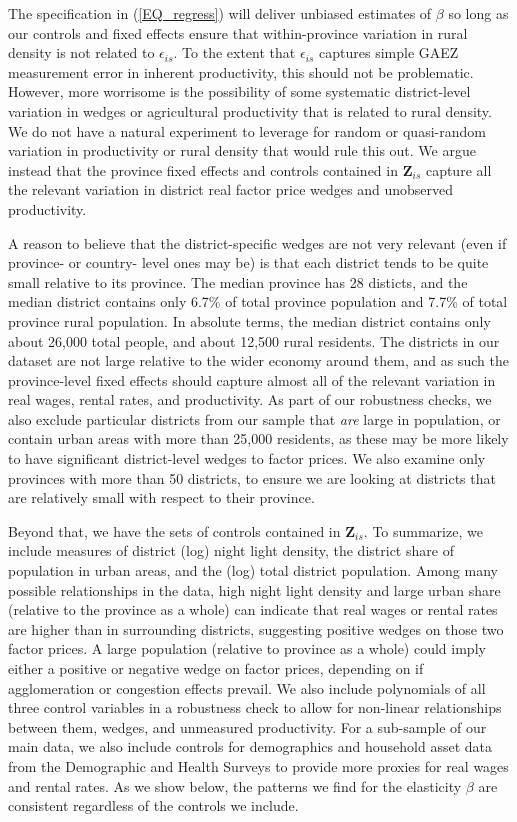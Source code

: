 The specification in (\ref{EQ_regress}) will deliver unbiased estimates of $\beta$ so long as our controls and fixed effects ensure that within-province variation in rural density is not related to $\epsilon_{is}$. To the extent that $\epsilon_{is}$ captures simple GAEZ measurement error in inherent productivity, this should not be problematic. However, more worrisome is the possibility of some systematic district-level variation in wedges or agricultural productivity that is related to rural density. We do not have a natural experiment to leverage for random or quasi-random variation in productivity or rural density that would rule this out. We argue instead that the province fixed effects and controls contained in $\mathbf{Z}_{is}$ capture all the relevant variation in district real factor price wedges and unobserved productivity. 

A reason to believe that the district-specific wedges are not very relevant (even if province- or country- level ones may be) is that each district tends to be quite small relative to its province. The median province has 28 disticts, and the median district contains only 6.7\% of total province population and 7.7\% of total province rural population. In absolute terms, the median district contains only about 26,000 total people, and about 12,500 rural residents. The districts in our dataset are not large relative to the wider economy around them, and as such the province-level fixed effects should capture almost all of the relevant variation in real wages, rental rates, and productivity. As part of our robustness checks, we also exclude particular districts from our sample that \textit{are} large in population, or contain urban areas with more than 25,000 residents, as these may be more likely to have significant district-level wedges to factor prices. We also examine only provinces with more than 50 districts, to ensure we are looking at districts that are relatively small with respect to their province.

Beyond that, we have the sets of controls contained in $\mathbf{Z}_{is}$. To summarize, we include measures of district (log) night light density, the district share of population in urban areas, and the (log) total district population. Among many possible relationships in the data, high night light density and large urban share (relative to the province as a whole) can indicate that real wages or rental rates are higher than in surrounding districts, suggesting positive wedges on those two factor prices. A large population (relative to province as a whole) could imply either a positive or negative wedge on factor prices, depending on if agglomeration or congestion effects prevail. We also include polynomials of all three control variables in a robustness check to allow for non-linear relationships between them, wedges, and unmeasured productivity. For a sub-sample of our main data, we also include controls for demographics and household asset data from the Demographic and Health Surveys to provide more proxies for real wages and rental rates. As we show below, the patterns we find for the elasticity $\beta$ are consistent regardless of the controls we include.


